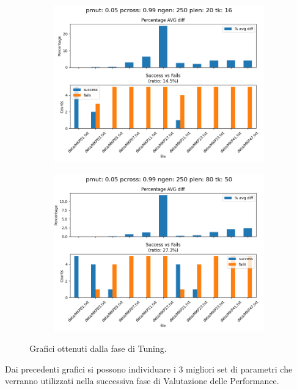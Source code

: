 \begin{figure}[H]
    \begin{subfigure}{.3\textwidth}
        \includegraphics[width=\textwidth]{img/tuning/tuning_results_5_99_250_20_16.png}
    \end{subfigure}
    \begin{subfigure}{.3\textwidth}
        \includegraphics[width=\textwidth]{img/tuning/tuning_results_5_99_250_80_50.png}
    \end{subfigure}

    \caption{Grafici ottenuti dalla fase di Tuning.}
\end{figure}

Dai precedenti grafici si possono individuare i 3 migliori set di parametri che
verranno utilizzati nella successiva fase di Valutazione delle Performance.

